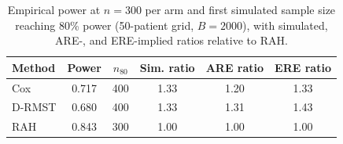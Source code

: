 \begin{table}[ht]
\centering
\caption{Empirical power at $n=300$ per arm and first simulated sample size reaching 80\% power (50-patient grid, $B=2000$), with simulated, ARE-, and ERE-implied ratios relative to RAH.}
\label{tab:cm057-power-n80}
\begin{tabular}{lccccc}
\toprule
Method & Power & $n_{80}$ & Sim. ratio & ARE ratio & ERE ratio
\\
\midrule
Cox & 0.717 & 400 & 1.33 & 1.20 & 1.33 \\
D-RMST & 0.680 & 400 & 1.33 & 1.31 & 1.43 \\
RAH & 0.843 & 300 & 1.00 & 1.00 & 1.00 \\
\bottomrule
\end{tabular}
\end{table}
